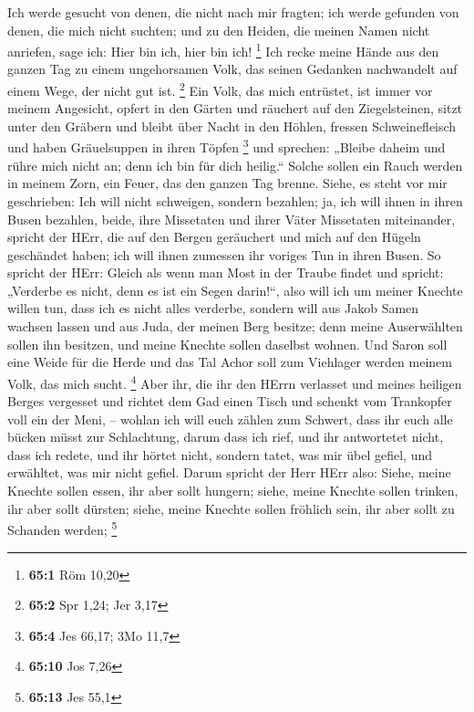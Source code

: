  Ich werde gesucht von denen, die nicht nach mir fragten;
ich werde gefunden von denen, die mich nicht suchten; und zu den Heiden,
die meinen Namen nicht anriefen, sage ich: Hier bin ich, hier bin ich!
\footnote{\textbf{65:1} Röm 10,20}  Ich recke meine Hände
aus den ganzen Tag zu einem ungehorsamen Volk, das seinen Gedanken
nachwandelt auf einem Wege, der nicht gut ist. \footnote{\textbf{65:2}
  Spr 1,24; Jer 3,17}  Ein Volk, das mich entrüstet, ist
immer vor meinem Angesicht, opfert in den Gärten und räuchert auf den
Ziegelsteinen,  sitzt unter den Gräbern und bleibt über
Nacht in den Höhlen, fressen Schweinefleisch und haben Gräuelsuppen in
ihren Töpfen \footnote{\textbf{65:4} Jes 66,17; 3Mo 11,7} 
und sprechen: „Bleibe daheim und rühre mich nicht an; denn ich bin für
dich heilig.`` Solche sollen ein Rauch werden in meinem Zorn, ein Feuer,
das den ganzen Tag brenne.  Siehe, es steht vor mir
geschrieben: Ich will nicht schweigen, sondern bezahlen; ja, ich will
ihnen in ihren Busen bezahlen,  beide, ihre Missetaten und
ihrer Väter Missetaten miteinander, spricht der HErr, die auf den Bergen
geräuchert und mich auf den Hügeln geschändet haben; ich will ihnen
zumessen ihr voriges Tun in ihren Busen.  So spricht der
HErr: Gleich als wenn man Most in der Traube findet und spricht:
„Verderbe es nicht, denn es ist ein Segen darin!{}``, also will ich um
meiner Knechte willen tun, dass ich es nicht alles verderbe,
 sondern will aus Jakob Samen wachsen lassen und aus Juda,
der meinen Berg besitze; denn meine Auserwählten sollen ihn besitzen,
und meine Knechte sollen daselbst wohnen.  Und Saron soll
eine Weide für die Herde und das Tal Achor soll zum Viehlager werden
meinem Volk, das mich sucht. \footnote{\textbf{65:10} Jos 7,26}
 Aber ihr, die ihr den HErrn verlasset und meines
heiligen Berges vergesset und richtet dem Gad einen Tisch und schenkt
vom Trankopfer voll ein der Meni, --  wohlan ich will
euch zählen zum Schwert, dass ihr euch alle bücken müsst zur
Schlachtung, darum dass ich rief, und ihr antwortetet nicht, dass ich
redete, und ihr hörtet nicht, sondern tatet, was mir übel gefiel, und
erwähltet, was mir nicht gefiel.  Darum spricht der Herr
HErr also: Siehe, meine Knechte sollen essen, ihr aber sollt hungern;
siehe, meine Knechte sollen trinken, ihr aber sollt dürsten; siehe,
meine Knechte sollen fröhlich sein, ihr aber sollt zu Schanden werden;
\footnote{\textbf{65:13} Jes 55,1}

